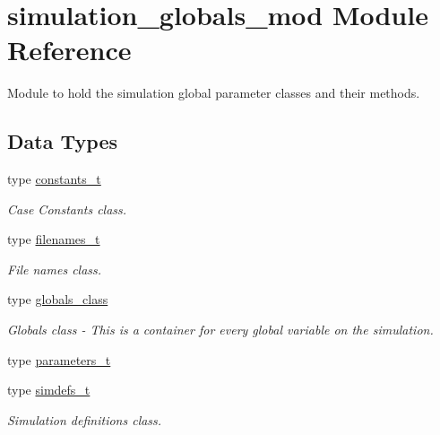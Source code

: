 \hypertarget{namespacesimulation__globals__mod}{}\section{simulation\+\_\+globals\+\_\+mod Module Reference}
\label{namespacesimulation__globals__mod}


Module to hold the simulation global parameter classes and their methods.  


\subsection*{Data Types}
\begin{DoxyCompactItemize}
\item 
type \mbox{\hyperlink{structsimulation__globals__mod_1_1constants__t}{constants\+\_\+t}}
\begin{DoxyCompactList}\small\item\em Case Constants class. \end{DoxyCompactList}\item 
type \mbox{\hyperlink{structsimulation__globals__mod_1_1filenames__t}{filenames\+\_\+t}}
\begin{DoxyCompactList}\small\item\em File names class. \end{DoxyCompactList}\item 
type \mbox{\hyperlink{structsimulation__globals__mod_1_1globals__class}{globals\+\_\+class}}
\begin{DoxyCompactList}\small\item\em Globals class -\/ This is a container for every global variable on the simulation. \end{DoxyCompactList}\item 
type \mbox{\hyperlink{structsimulation__globals__mod_1_1parameters__t}{parameters\+\_\+t}}
\item 
type \mbox{\hyperlink{structsimulation__globals__mod_1_1simdefs__t}{simdefs\+\_\+t}}
\begin{DoxyCompactList}\small\item\em Simulation definitions class. \end{DoxyCompactList}\end{DoxyCompactItemize}
